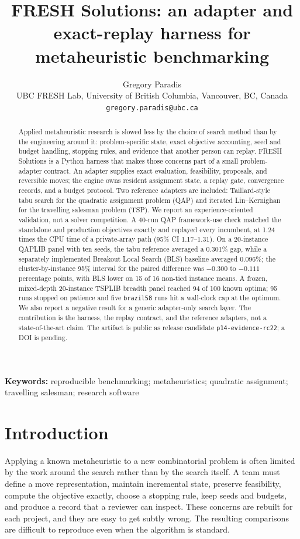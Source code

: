 \documentclass[10pt]{article}
\title{FRESH Solutions: an adapter and exact-replay harness for metaheuristic benchmarking}
\author{Gregory Paradis\\UBC FRESH Lab, University of British Columbia, Vancouver, BC, Canada\\\texttt{gregory.paradis@ubc.ca}}
\date{}
\begin{document}
\maketitle

\begin{abstract}
\noindent
Applied metaheuristic research is slowed less by the choice of search method than by the engineering
around it: problem-specific state, exact objective accounting, seed and budget handling, stopping
rules, and evidence that another person can replay. FRESH Solutions is a Python harness that makes
those concerns part of a small problem-adapter contract. An adapter supplies exact evaluation,
feasibility, proposals, and reversible moves; the engine owns resident assignment state, a replay
gate, convergence records, and a budget protocol. Two reference adapters are included: Taillard-style tabu
search for the quadratic assignment problem (QAP) and iterated Lin--Kernighan for the travelling
salesman problem (TSP). We report an experience-oriented validation, not a solver competition. A
40-run QAP framework-use check matched the standalone and production objectives exactly and replayed
every incumbent, at 1.24 times the CPU time of a private-array path (95\% CI 1.17--1.31). On a
20-instance QAPLIB panel with ten seeds, the tabu reference averaged a 0.301\% gap, while a separately
implemented Breakout Local Search (BLS) baseline averaged 0.096\%; the cluster-by-instance 95\%
interval for the paired difference was $-0.300$ to $-0.111$ percentage points, with BLS lower on 15
of 16 non-tied instance means. A frozen, mixed-depth 20-instance TSPLIB breadth panel reached 94 of
100 known optima; 95 runs stopped on patience and five \texttt{brazil58} runs hit a wall-clock cap at
the optimum. We also report a negative result for a generic adapter-only search layer. The
contribution is the harness, the replay contract, and the reference adapters, not a
state-of-the-art claim. The artifact is public as release candidate \texttt{p14-evidence-rc22}; a DOI is pending.
\end{abstract}

\noindent\textbf{Keywords:} reproducible benchmarking; metaheuristics; quadratic assignment; travelling salesman; research software

\section{Introduction}

Applying a known metaheuristic to a new combinatorial problem is often limited by the work around
the search rather than by the search itself. A team must define a move representation, maintain
incremental state, preserve feasibility, compute the objective exactly, choose a stopping rule, keep
seeds and budgets, and produce a record that a reviewer can inspect. These concerns are rebuilt for
each project, and they are easy to get subtly wrong. The resulting comparisons are difficult to
reproduce even when the algorithm is standard.
\end{document}
